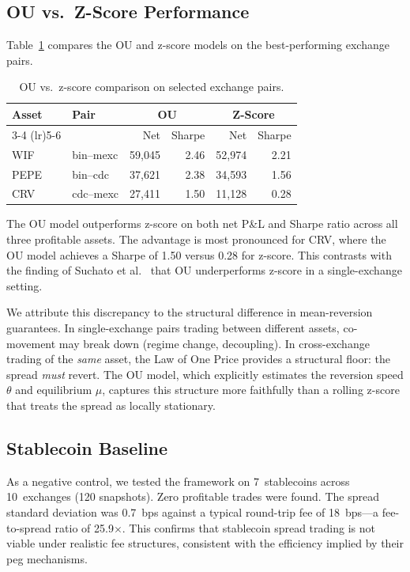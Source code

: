 \documentclass[sigconf,nonacm=false]{acmart}
\begin{document}
\subsection{OU vs.\ Z-Score Performance}

Table~\ref{tab:ou_vs_zscore} compares the OU and z-score models on the best-performing exchange pairs.

\begin{table}[h]
\caption{OU vs.\ z-score comparison on selected exchange pairs.}
\label{tab:ou_vs_zscore}
\begin{tabular}{llrrrr}
\toprule
\textbf{Asset} & \textbf{Pair} & \multicolumn{2}{c}{\textbf{OU}} & \multicolumn{2}{c}{\textbf{Z-Score}} \\
\cmidrule(lr){3-4} \cmidrule(lr){5-6}
 & & Net & Sharpe & Net & Sharpe \\
\midrule
WIF  & bin--mexc  & 59,045 & 2.46 & 52,974 & 2.21 \\
PEPE & bin--cdc   & 37,621 & 2.38 & 34,593 & 1.56 \\
CRV  & cdc--mexc  & 27,411 & 1.50 & 11,128 & 0.28 \\
\bottomrule
\end{tabular}
\end{table}

The OU model outperforms z-score on both net P\&L and Sharpe ratio across all three profitable assets. The advantage is most pronounced for CRV, where the OU model achieves a Sharpe of 1.50 versus 0.28 for z-score. This contrasts with the finding of Suchato et al.~\cite{suchato2024application} that OU underperforms z-score in a single-exchange setting.

We attribute this discrepancy to the structural difference in mean-reversion guarantees. In single-exchange pairs trading between different assets, co-movement may break down (regime change, decoupling). In cross-exchange trading of the \emph{same} asset, the Law of One Price provides a structural floor: the spread \emph{must} revert. The OU model, which explicitly estimates the reversion speed $\theta$ and equilibrium $\mu$, captures this structure more faithfully than a rolling z-score that treats the spread as locally stationary.

\subsection{Stablecoin Baseline}

As a negative control, we tested the framework on 7~stablecoins across 10~exchanges (120 snapshots). Zero profitable trades were found. The spread standard deviation was 0.7~bps against a typical round-trip fee of 18~bps---a fee-to-spread ratio of 25.9$\times$. This confirms that stablecoin spread trading is not viable under realistic fee structures, consistent with the efficiency implied by their peg mechanisms.
\end{document}
